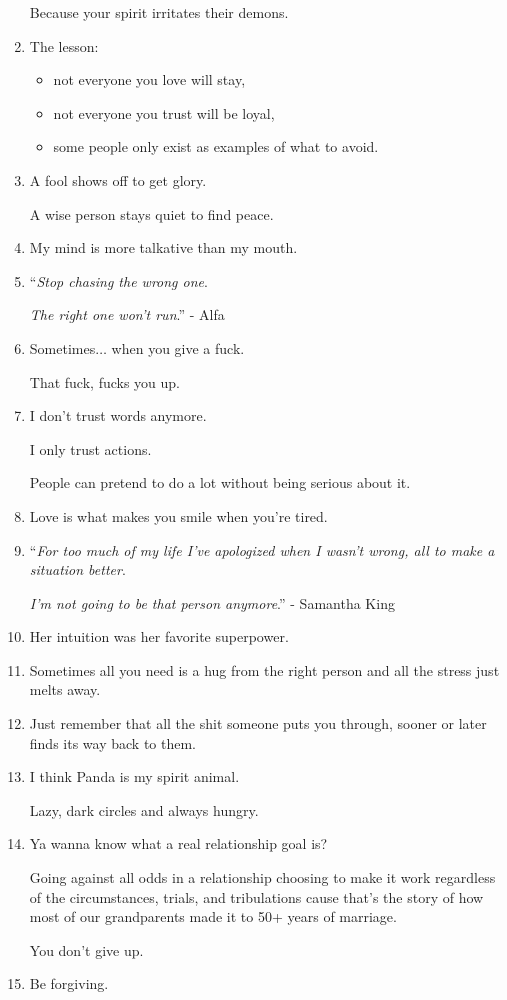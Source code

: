 \documentclass{article}
\begin{document}
\begin{enumerate}
	Because your spirit irritates their demons.
	\item The lesson:
	\begin{itemize}
		\item not everyone you love will stay,
		\item not everyone you trust will be loyal,
		\item some people only exist as examples of what to avoid.
	\end{itemize}
	\item A fool shows off to get glory.
	
	A wise person stays quiet to find peace.
	\item My mind is more talkative than my mouth.
	\item ``\textit{Stop chasing the wrong one}.
	
	\textit{The right one won't run}.'' - Alfa
	\item Sometimes$\ldots$ when you give a fuck.
	
	That fuck, fucks you up.
	\item I don't trust words anymore.
	
	I only trust actions.
	
	People can pretend to do a lot without being serious about it.
	\item Love is what makes you smile when you're tired.
	\item ``\textit{For too much of my life I've apologized when I wasn't wrong, all to make a situation better}.
	
	\textit{I'm not going to be that person anymore}.'' - Samantha King
	\item Her intuition was her favorite superpower.
	\item Sometimes all you need is a hug from the right person and all the stress just melts away.
	\item Just remember that all the shit someone puts you through, sooner or later finds its way back to them.
	\item I think Panda is my spirit animal.
	
	Lazy, dark circles and always hungry.
	\item Ya wanna know what a real relationship goal is?
	
	Going against all odds in a relationship choosing to make it work regardless of the circumstances, trials, and tribulations cause that's the story of how most of our grandparents made it to 50+ years of marriage.
	
	You don't give up.
	\item Be forgiving.
	

\end{enumerate}
\end{document}
